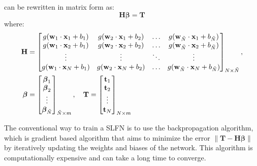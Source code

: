  can be rewritten in matrix form as:
\begin{equation}
    \textbf{H}\boldsymbol\beta = \textbf{T}
\end{equation}
where:
\begin{align}
    \textbf H &= \begin{bmatrix}
        g(\textbf w_1 \cdot \textbf x_1 + b_1) & g(\textbf w_2 \cdot \textbf x_1 + b_2) & \dots & g(\textbf w_{\tilde{N}} \cdot \textbf x_1 + b_{\tilde{N}}) \\
        g(\textbf w_1 \cdot \textbf x_2 + b_1) & g(\textbf w_2 \cdot \textbf x_2 + b_2) & \dots & g(\textbf w_{\tilde{N}} \cdot \textbf x_2 + b_{\tilde{N}}) \\
        \vdots                                 & \vdots                                 & \ddots & \vdots                                 \\
        g(\textbf w_1 \cdot \textbf x_N + b_1) & g(\textbf w_2 \cdot \textbf x_N + b_2) & \dots & g(\textbf w_{\tilde{N}} \cdot \textbf x_N + b_{\tilde{N}})
    \end{bmatrix}_{N \times \tilde{N}}, \\
    \boldsymbol\beta &= \begin{bmatrix}
        \boldsymbol\beta_1 \\
        \boldsymbol\beta_2 \\
        \vdots             \\
        \boldsymbol\beta_{\tilde{N}}
    \end{bmatrix}_{\tilde{N} \times m}, \quad
    \textbf T = \begin{bmatrix}
        \textbf t_1 \\
        \textbf t_2 \\
        \vdots      \\
        \textbf t_N
    \end{bmatrix}_{N \times m}
\end{align}

The conventional way to train a SLFN is to use the backpropagation algorithm,
which is gradient based algorithm that aims to minimize the error $\left\lVert
\textbf{T} - \textbf{H}\boldsymbol\beta \right\rVert$ by iteratively updating
the weights and biases of the network. This algorithm is computationally
expensive and can take a long time to converge.

